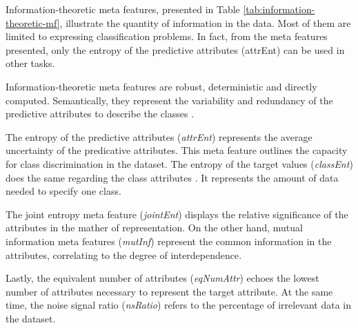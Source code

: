 Information-theoretic meta features, presented in Table \ref{tab:information-theoretic-mf}, illustrate the quantity of information in the data. Most of them are limited to expressing classification problems. In fact, from the meta features presented, only the entropy of the predictive attributes (attrEnt) can be used in other tasks. 

Information-theoretic meta features are robust, deterministic and directly computed. Semantically, they represent the variability and redundancy of the predictive attributes to describe the classes \citep{rivolli2019characterizing}.

The entropy of the predictive attributes (\textit{attrEnt}) represents the average uncertainty of the predicative attributes. This meta feature outlines the capacity for class discrimination in the dataset. The entropy of the target values (\textit{classEnt}) does the same regarding the class attributes \citep{segrera2008information}. It represents the amount of data needed to specify one class.

The joint entropy meta feature (\textit{jointEnt}) displays the relative significance of the attributes in the mather of representation. On the other hand, mutual information meta features (\textit{mutInf}) represent the common information in the attributes, correlating to the degree of interdependence.

Lastly, the equivalent number of attributes (\textit{eqNumAttr}) echoes the lowest number of attributes necessary to represent the target attribute. At the same time, the noise signal ratio (\textit{nsRatio}) refers to the percentage of irrelevant data in the dataset.

